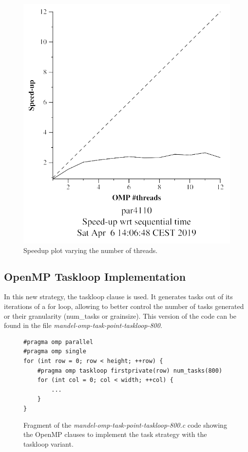 \documentclass[12pt, a4paper]{article}
\begin{document}
\begin{figure}[H]
\begin{minipage}[b]{0.4\linewidth}
  \includegraphics[scale=0.5]{./mandel-omp-10000-strong-23-speedup}
  \caption{Speedup plot varying the number of threads.}
  \label{fig:mandel-omp-10000-strong-23-speedup}
\end{minipage}
\end{figure}

\subsection{OpenMP Taskloop Implementation}

In this new strategy, the taskloop clause is used. It generates tasks out of its iterations of a for loop, allowing to better control the number of tasks generated or their granularity (num\_tasks or grainsize). This version of the code can be found in the file \textit{mandel-omp-task-point-taskloop-800}.

\begin{figure}[H]
\begin{lstlisting}
#pragma omp parallel
#pragma omp single
for (int row = 0; row < height; ++row) {
	#pragma omp taskloop firstprivate(row) num_tasks(800)
    for (int col = 0; col < width; ++col) {
    	...
    }
}
\end{lstlisting}
\caption{Fragment of the \textit{mandel-omp-task-point-taskloop-800.c} code showing the OpenMP clauses to implement the task strategy with the taskloop variant.}
\label{code:task_implementation_point_taskloop_800}
\end{figure}
\end{document}
